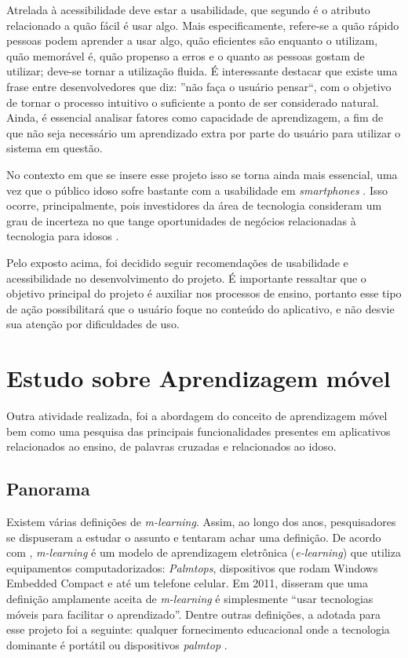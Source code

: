 Atrelada à acessibilidade deve estar a usabilidade, que segundo \cite{nielsenPrioritizingWebUsability}
é o atributo relacionado a quão fácil é usar algo. Mais especificamente, refere-se a quão rápido pessoas podem aprender a usar algo, quão eficientes são enquanto o utilizam, quão memorável é, quão propenso a erros e o quanto as pessoas gostam de utilizar; deve-se tornar a utilização fluida. É interessante destacar que existe uma frase entre desenvolvedores que diz: ''não faça o usuário pensar``, com o objetivo de tornar o processo intuitivo o suficiente a ponto de ser considerado natural.
Ainda, é essencial analisar fatores como capacidade de aprendizagem, a fim de que não seja necessário um aprendizado extra por parte do usuário para utilizar o sistema em questão.

No contexto em que se insere esse projeto isso se torna ainda mais essencial, uma vez que o público idoso sofre bastante com a usabilidade em \textit{smartphones} \citep{dificuldadesIdosos}. Isso ocorre, principalmente, pois investidores da área de tecnologia consideram um grau de incerteza no que tange oportunidades de negócios relacionadas à tecnologia para idosos \citep{NBCelderly}.

Pelo exposto acima, foi decidido seguir recomendações de usabilidade e acessibilidade no desenvolvimento do projeto. É importante ressaltar que o objetivo principal do projeto é auxiliar nos processos de ensino, portanto esse tipo de ação possibilitará que o usuário foque no conteúdo do aplicativo, e não desvie sua atenção por dificuldades de uso.

\section{Estudo sobre Aprendizagem móvel}\label{sec:estudos_ap_movel} 
Outra atividade realizada, foi a abordagem do conceito de aprendizagem móvel bem como uma pesquisa das principais funcionalidades presentes em aplicativos relacionados ao ensino, de palavras cruzadas e relacionados ao idoso.

\subsection{Panorama}
Existem várias definições de \textit{m-learning}. Assim, ao longo dos anos, pesquisadores se dispuseram a estudar o assunto e tentaram achar uma definição. De acordo com \cite{Quinn2000}, \textit{m-learning} é um modelo de aprendizagem eletrônica (\textit{e-learning}) que utiliza equipamentos computadorizados: \textit{Palmtops}, dispositivos que rodam Windows Embedded Compact e até um telefone celular.
Em 2011, \cite{hwang2011research} disseram que uma definição amplamente aceita de \textit{m-learning} é simplesmente ``usar tecnologias móveis para facilitar o aprendizado''. Dentre outras definições, a adotada para esse projeto foi a seguinte: qualquer fornecimento educacional onde a tecnologia dominante é portátil ou dispositivos \textit{palmtop} \citep{traxler2005defining}.

